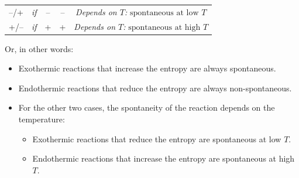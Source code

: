 \documentclass[
]{book}
\providecommand{\tightlist}{%
  \setlength{\itemsep}{0pt}\setlength{\parskip}{0pt}}
\theoremstyle{definition}
\theoremstyle{definition}
\theoremstyle{definition}
\theoremstyle{remark}
\begin{document}
\begin{longtable}[]{@{}clccc@{}}
\begin{minipage}[t]{0.15\columnwidth}\centering
--/+\strut
\end{minipage} & \begin{minipage}[t]{0.03\columnwidth}\raggedright
\emph{if}\strut
\end{minipage} & \begin{minipage}[t]{0.15\columnwidth}\centering
--\strut
\end{minipage} & \begin{minipage}[t]{0.15\columnwidth}\centering
--\strut
\end{minipage} & \begin{minipage}[t]{0.38\columnwidth}\centering
\emph{Depends on \(T\):} \(\scriptstyle{\text{spontaneous at low } T}\)\strut
\end{minipage}\tabularnewline
\begin{minipage}[t]{0.15\columnwidth}\centering
+/--\strut
\end{minipage} & \begin{minipage}[t]{0.03\columnwidth}\raggedright
\emph{if}\strut
\end{minipage} & \begin{minipage}[t]{0.15\columnwidth}\centering
+\strut
\end{minipage} & \begin{minipage}[t]{0.15\columnwidth}\centering
+\strut
\end{minipage} & \begin{minipage}[t]{0.38\columnwidth}\centering
\emph{Depends on \(T\):} \(\scriptstyle{\text{spontaneous at high } T}\)\strut
\end{minipage}\tabularnewline
\bottomrule
\end{longtable}

Or, in other words:

\begin{itemize}
\tightlist
\item
  Exothermic reactions that increase the entropy are always spontaneous.
\item
  Endothermic reactions that reduce the entropy are always non-spontaneous.
\item
  For the other two cases, the spontaneity of the reaction depends on the temperature:

  \begin{itemize}
  \tightlist
  \item
    Exothermic reactions that reduce the entropy are spontaneous at low \(T\).
  \item
    Endothermic reactions that increase the entropy are spontaneous at high \(T\).
  \end{itemize}
\end{itemize}
\end{document}
